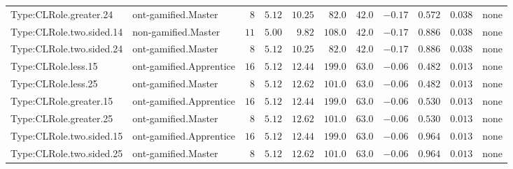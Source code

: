 \documentclass[6pt,a4paper]{article}
\begin{document}
{\begin{longtable}{llrrrrrrrrl}
Type:CLRole.greater.24&ont-gamified.Master&$ 8$&$5.12$&$10.25$&$ 82.0$&$ 42.0$&$-0.17$&$0.572$&$0.038$&none\tabularnewline
Type:CLRole.two.sided.14&non-gamified.Master&$11$&$5.00$&$ 9.82$&$108.0$&$ 42.0$&$-0.17$&$0.886$&$0.038$&none\tabularnewline
Type:CLRole.two.sided.24&ont-gamified.Master&$ 8$&$5.12$&$10.25$&$ 82.0$&$ 42.0$&$-0.17$&$0.886$&$0.038$&none\tabularnewline
Type:CLRole.less.15&ont-gamified.Apprentice&$16$&$5.12$&$12.44$&$199.0$&$ 63.0$&$-0.06$&$0.482$&$0.013$&none\tabularnewline
Type:CLRole.less.25&ont-gamified.Master&$ 8$&$5.12$&$12.62$&$101.0$&$ 63.0$&$-0.06$&$0.482$&$0.013$&none\tabularnewline
Type:CLRole.greater.15&ont-gamified.Apprentice&$16$&$5.12$&$12.44$&$199.0$&$ 63.0$&$-0.06$&$0.530$&$0.013$&none\tabularnewline
Type:CLRole.greater.25&ont-gamified.Master&$ 8$&$5.12$&$12.62$&$101.0$&$ 63.0$&$-0.06$&$0.530$&$0.013$&none\tabularnewline
\newpage
Type:CLRole.two.sided.15&ont-gamified.Apprentice&$16$&$5.12$&$12.44$&$199.0$&$ 63.0$&$-0.06$&$0.964$&$0.013$&none\tabularnewline
Type:CLRole.two.sided.25&ont-gamified.Master&$ 8$&$5.12$&$12.62$&$101.0$&$ 63.0$&$-0.06$&$0.964$&$0.013$&none\tabularnewline
\hline
\end{longtable}}
\end{document}
